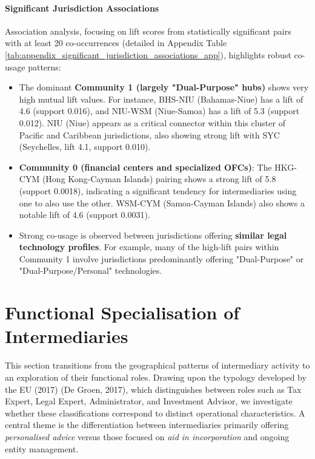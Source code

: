 \paragraph{Significant Jurisdiction Associations}
Association analysis, focusing on lift scores from statistically significant pairs with at least 20 co-occurrences (detailed in Appendix Table \ref{tab:appendix_significant_jurisdiction_associations_app}), highlights robust co-usage patterns:
\begin{itemize}
    \item The dominant \textbf{Community 1 (largely "Dual-Purpose" hubs)} shows very high mutual lift values. For instance, BHS-NIU (Bahamas-Niue) has a lift of 4.6 (support 0.016), and NIU-WSM (Niue-Samoa) has a lift of 5.3 (support 0.012). NIU (Niue) appears as a critical connector within this cluster of Pacific and Caribbean jurisdictions, also showing strong lift with SYC (Seychelles, lift 4.1, support 0.010).
    \item \textbf{Community 0 (financial centers and specialized OFCs)}: The HKG-CYM (Hong Kong-Cayman Islands) pairing shows a strong lift of 5.8 (support 0.0018), indicating a significant tendency for intermediaries using one to also use the other. WSM-CYM (Samoa-Cayman Islands) also shows a notable lift of 4.6 (support 0.0031).
    \item Strong co-usage is observed between jurisdictions offering \textbf{similar legal technology profiles}. For example, many of the high-lift pairs within Community 1 involve jurisdictions predominantly offering "Dual-Purpose" or "Dual-Purpose/Personal" technologies.
\end{itemize}


\section{Functional Specialisation of Intermediaries}
\label{sec:functional_specialisation}

This section transitions from the geographical patterns of intermediary activity to an exploration of their functional roles. Drawing upon the typology developed by the EU (2017) (De Groen, 2017), which distinguishes between roles such as Tax Expert, Legal Expert, Administrator, and Investment Advisor, we investigate whether these classifications correspond to distinct operational characteristics. A central theme is the differentiation between intermediaries primarily offering \textit{personalised advice} versus those focused on \textit{aid in incorporation} and ongoing entity management.

